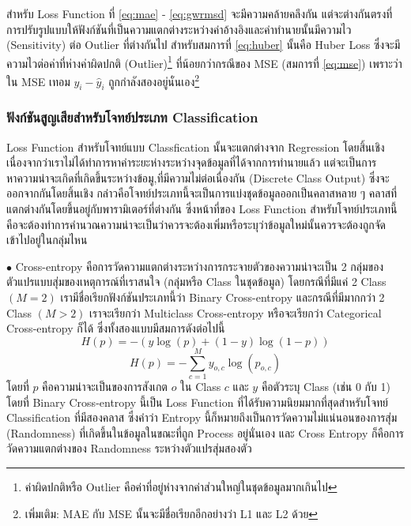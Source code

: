สำหรับ Loss Function ที่ \eqref{eq:mae} - \eqref{eq:gwrmsd} จะมีความคล้ายคลึงกัน แต่จะต่างกันตรงที่การปรับรูปแบบให้ฟังก์ชันที่เป็นความแตกต่างระหว่างค่าอ้างอิงและค่าทำนายนั้นมีความไว (Sensitivity) ต่อ Outlier ที่ต่างกันไป สำหรับสมการที่ \eqref{eq:huber} นั้นคือ Huber Loss ซึ่งจะมีความไวต่อค่าที่ห่างค่าผิดปกติ (Outlier)\footnote{ค่าผิดปกติหรือ Outlier คือค่าที่อยู่ห่างจากค่าส่วนใหญ่ในชุดข้อมูลมากเกินไป} ที่น้อยกว่ากรณีของ MSE (สมการที่ \eqref{eq:mse}) เพราะว่าใน MSE เทอม $y_{i} - \hat{y}_{i}$ ถูกกำลังสองอยู่นั่นเอง\footnote{เพิ่มเติม: MAE กับ MSE นั้นจะมีชื่อเรียกอีกอย่างว่า L1 และ L2 ด้วย}

\subsubsection{ฟังก์ชันสูญเสียสำหรับโจทย์ประเภท Classification}
\label{sssec:loss_func_class}

Loss Function สำหรับโจทย์แบบ Classfication นั้นจะแตกต่างจาก Regression โดยสิ้นเชิงเนื่องจากว่าเราไม่ได้ทำการหาค่าระยะห่างระหว่างจุดข้อมูลที่ได้จากการทำนายแล้ว แต่จะเป็นการหาความน่าจะเกิดที่เกิดขึ้นระหว่างข้อมู,ที่มีความไม่ต่อเนื่องกัน (Discrete Class Output) ซึ่งจะออกจากกันโดยสิ้นเชิง กล่าวคือโจทย์ประเภทนี้จะเป็นการแบ่งชุดข้อมูลออกเป็นคลาสหลาย ๆ คลาสที่แตกต่างกันโดยขึ้นอยู่กับพารามิเตอร์ที่ต่างกัน ซึ่งหน้าที่ของ Loss Function สำหรับโจทย์ประเภทนี้คือจะต้องทำการคำนวณความน่าจะเป็นว่าควรจะต้องเพิ่มหรือระบุว่าข้อมูลใหม่นั้นควรจะต้องถูกจัดเข้าไปอยู่ในกลุ่มไหน

\noindent $\bullet$ Cross-entropy คือการวัดความแตกต่างระหว่างการกระจายตัวของความน่าจะเป็น 2 กลุ่มของตัวแปรแบบสุ่มของเหตุการณ์ที่เราสนใจ (กลุ่มหรือ Class ในชุดข้อมูล) โดยกรณีที่มีแค่ 2 Class $(M = 2)$ เรามีชื่อเรียกฟังก์ชันประเภทนี้ว่า Binary Cross-entropy และกรณีที่มีมากกว่า 2 Class $(M > 2)$ เราจะเรียกว่า Multiclass Cross-entropy หรือจะเรียกว่า Categorical Cross-entropy ก็ได้ ซึ่งทั้งสองแบบมีสมการดังต่อไปนี้
%
\begin{equation}\label{eq:binary_entro}
    H(p) = -{(y\log(p) + (1 - y)\log(1 - p))}
\end{equation}
%
\begin{equation}\label{eq:multiclass_entro}
    H(p) = -\sum_{c=1}^My_{o,c}\log(p_{o,c})
\end{equation}
%
\noindent โดยที่ $p$ คือความน่าจะเป็นของการสังเกต $o$ ใน Class $c$ และ $y$ คือตัวระบุ Class (เช่น 0 กับ 1) โดยที่ Binary Cross-entropy นี้เป็น Loss Function ที่ได้รับความนิยมมากที่สุดสำหรับโจทย์ Classification ที่มีสองคลาส ซึ่งคำว่า Entropy นี้ก็หมายถึงเป็นการวัดความไม่แน่นอนของการสุ่ม (Randomness) ที่เกิดขึ้นในข้อมูลในขณะที่ถูก Process อยู่นั่นเอง และ Cross Entropy ก็คือการวัดความแตกต่างของ Randomness ระหว่างตัวแปรสุ่มสองตัว

